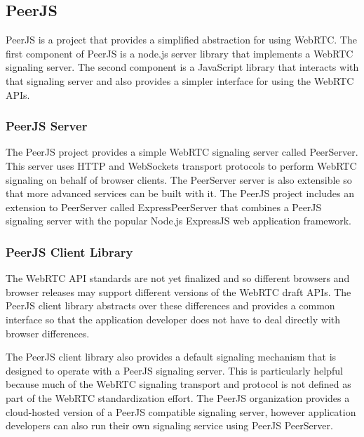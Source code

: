 \documentclass[conference,compsoc]{./IEEEtran/IEEEtran}
\begin{document}
\ifdefined\OPTIONAL

\subsection{PeerJS}

PeerJS is a project that provides a simplified abstraction for using
WebRTC. The first component of PeerJS is a node.js server library that
implements a WebRTC signaling server. The second component is
a JavaScript library that interacts with that signaling server and
also provides a simpler interface for using the WebRTC APIs.

\subsubsection{PeerJS Server}

The PeerJS project provides a simple WebRTC signaling server called
PeerServer. This server uses HTTP and WebSockets transport protocols
to perform WebRTC signaling on behalf of browser clients. The
PeerServer server is also extensible so that more advanced services
can be built with it. The PeerJS project includes an extension to
PeerServer called ExpressPeerServer that combines a PeerJS signaling
server with the popular Node.js ExpressJS web application framework.

\subsubsection{PeerJS Client Library}

The WebRTC API standards are not yet
finalized and so different browsers and browser releases may support
different versions of the WebRTC draft APIs. %
The PeerJS client library abstracts over these differences and
provides a common interface so that the application developer does not
have to deal directly with browser differences.

The PeerJS client library also provides a default signaling mechanism
that is designed to operate with a PeerJS signaling server. This is
particularly helpful because much of the WebRTC signaling transport
and protocol is not defined as part of the WebRTC standardization
effort. %
The PeerJS organization provides a cloud-hosted version of a PeerJS
compatible signaling server, however application developers can also
run their own signaling service using PeerJS PeerServer.

\fi  %
\end{document}
